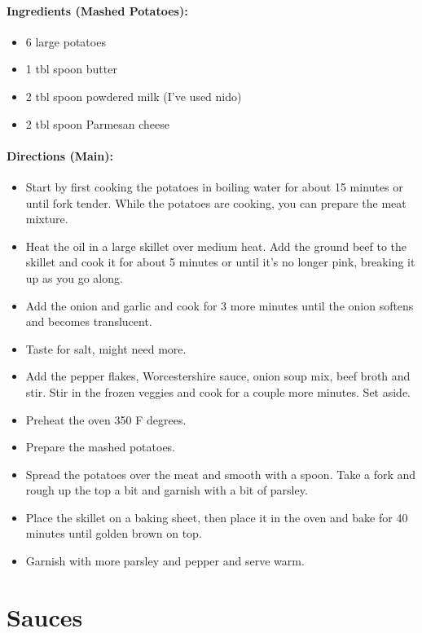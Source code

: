 \documentclass{article}
\begin{document}
\paragraph{Ingredients (Mashed Potatoes):}
\begin{itemize}
    \item 6 large potatoes
    \item 1 tbl spoon butter
    \item 2 tbl spoon powdered milk (I’ve used nido)
    \item 2 tbl spoon Parmesan cheese
\end{itemize}  

\paragraph{Directions (Main):}
\begin{itemize}
    \item Start by first cooking the potatoes in boiling water for about 15 minutes or until fork tender. While the potatoes are cooking, you can prepare the meat mixture.
    \item Heat the oil in a large skillet over medium heat. Add the ground beef to the skillet and cook it for about 5 minutes or until it’s no longer pink, breaking it up as you go along.
    \item Add the onion and garlic and cook for 3 more minutes until the onion softens and becomes translucent.
    \item Taste for salt, might need more.
    \item Add the pepper flakes, Worcestershire sauce, onion soup mix, beef broth and stir. Stir in the frozen veggies and cook for a couple more minutes. Set aside.
    \item Preheat the oven 350 F degrees.
    \item Prepare the mashed potatoes.
    \item Spread the potatoes over the meat and smooth with a spoon. Take a fork and rough up the top a bit and garnish with a bit of parsley.
    \item Place the skillet on a baking sheet, then place it in the oven and bake for 40 minutes until golden brown on top.
    \item Garnish with more parsley and pepper and serve warm.
\end{itemize} 

\section{Sauces}
\end{document}
